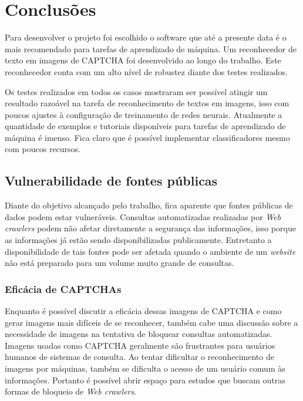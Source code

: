 \chapter{ Conclusões }

Para desenvolver o projeto foi escolhido o software que até a presente
data é o mais recomendado para tarefas de aprendizado de máquina. Um
reconhecedor de texto em imagens de CAPTCHA foi desenvolvido ao longo
do trabalho. Este reconhecedor conta com um alto nível de robustez
diante dos testes realizados.

Os testes realizados em todos os casos mostraram ser possível atingir um
resultado razoável na tarefa de reconhecimento de textos em imagens,
isso com poucos ajustes à configuração de treinamento de redes
neurais. Atualmente a quantidade de exemplos e tutoriais disponíveis
para tarefas de aprendizado de máquina é imenso. Fica claro que é
possível implementar classificadores mesmo com poucos recursos.

\section{Vulnerabilidade de fontes públicas}

Diante do objetivo alcançado pelo trabalho, fica aparente que fontes
públicas de dados podem estar vulneráveis. Consultas automatizadas
realizadas por \textit{Web crawlers} podem não afetar diretamente a
segurança das informações, isso porque as informações já estão sendo
disponibilizadas publicamente. Entretanto a disponibilidade de tais
fontes pode ser afetada quando o ambiente de um \textit{website} não
está preparado para um volume muito grande de consultas.

\subsection{Eficácia de CAPTCHAs}

Enquanto é possível discutir a eficácia dessas imagens de CAPTCHA e
como gerar imagens mais difíceis de se reconhecer, também cabe uma
discussão sobre a necessidade de imagens na tentativa de bloquear
consultas automatizadas. Imagens usadas como CAPTCHA geralmente são
frustrantes para usuários humanos de sistemas de consulta. Ao tentar
dificultar o reconhecimento de imagens por máquinas, também se
dificulta o acesso de um usuário comum às informações. Portanto é
possível abrir espaço para estudos que buscam outras formas de
bloqueio de \textit{Web crawlers}.

